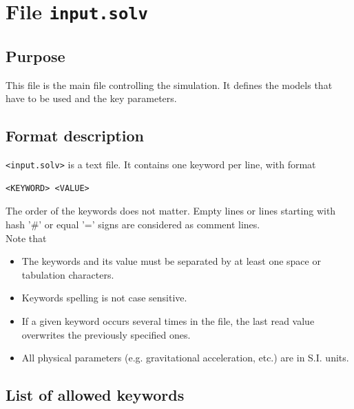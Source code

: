 \hypertarget{InputSwddFormat}{}
\section{File \texttt{input.solv}}
\subsection{Purpose}
This file is the main file controlling the simulation. It defines the models that have to be used and the key parameters.

\subsection{Format description}
\texttt{<input.solv>} is a text file. It contains one keyword per line, with format
\begin{lstlisting}
<KEYWORD> <VALUE>
\end{lstlisting}
The order of the keywords does not matter. Empty lines or lines starting with hash '\#' or equal '=' signs are considered as comment lines.\\
Note that
\begin{itemize}
\item The keywords and its value must be separated by at least one space or tabulation characters.
\item Keywords spelling is not case sensitive.
\item If a given keyword occurs several times in the file, the last read value overwrites the previously specified ones.
\item All physical parameters (e.g. gravitational acceleration, etc.) are in S.I. units.
\end{itemize}

\subsection{List of allowed keywords}

